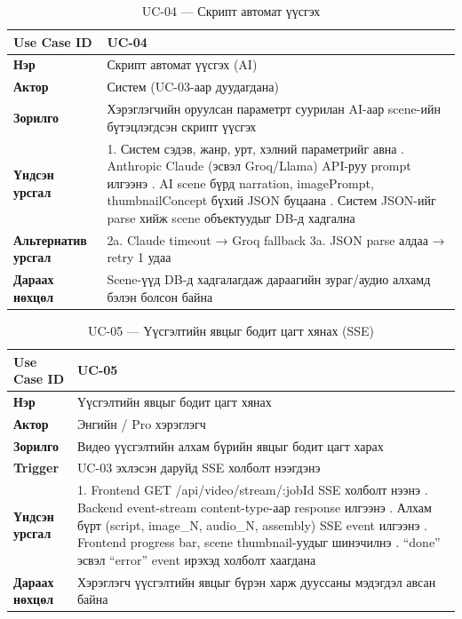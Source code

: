 \begin{table}[H]
\centering
\label{tab:uc04}
\begin{tabular}{|l|p{9.5cm}|}
\hline
\textbf{Use Case ID} & UC-04 \\
\hline
\textbf{Нэр} & Скрипт автомат үүсгэх (AI) \\
\hline
\textbf{Актор} & Систем (UC-03-аар дуудагдана) \\
\hline
\textbf{Зорилго} & Хэрэглэгчийн оруулсан параметрт суурилан AI-аар scene-ийн бүтэцлэгдсэн скрипт үүсгэх \\
\hline
\textbf{Үндсэн урсгал} &
1. Систем сэдэв, жанр, урт, хэлний параметрийг авна \newline
2. Anthropic Claude (эсвэл Groq/Llama) API-руу prompt илгээнэ \newline
3. AI scene бүрд narration, imagePrompt, thumbnailConcept бүхий JSON буцаана \newline
4. Систем JSON-ийг parse хийж scene объектуудыг DB-д хадгална \\
\hline
\textbf{Альтернатив урсгал} & 2a. Claude timeout → Groq fallback \newline 3a. JSON parse алдаа → retry 1 удаа \\
\hline
\textbf{Дараах нөхцөл} & Scene-үүд DB-д хадгалагдаж дараагийн зураг/аудио алхамд бэлэн болсон байна \\
\hline
\end{tabular}
\caption{UC-04 --- Скрипт автомат үүсгэх}
\end{table}

\begin{table}[H]
\centering
\label{tab:uc05}
\begin{tabular}{|l|p{9.5cm}|}
\hline
\textbf{Use Case ID} & UC-05 \\
\hline
\textbf{Нэр} & Үүсгэлтийн явцыг бодит цагт хянах \\
\hline
\textbf{Актор} & Энгийн / Pro хэрэглэгч \\
\hline
\textbf{Зорилго} & Видео үүсгэлтийн алхам бүрийн явцыг бодит цагт харах \\
\hline
\textbf{Trigger} & UC-03 эхлэсэн даруйд SSE холболт нээгдэнэ \\
\hline
\textbf{Үндсэн урсгал} &
1. Frontend GET /api/video/stream/:jobId SSE холболт нээнэ \newline
2. Backend event-stream content-type-аар response илгээнэ \newline
3. Алхам бүрт (script, image\_N, audio\_N, assembly) SSE event илгээнэ \newline
4. Frontend progress bar, scene thumbnail-уудыг шинэчилнэ \newline
5. ``done'' эсвэл ``error'' event ирэхэд холболт хаагдана \\
\hline
\textbf{Дараах нөхцөл} & Хэрэглэгч үүсгэлтийн явцыг бүрэн харж дууссаны мэдэгдэл авсан байна \\
\hline
\end{tabular}
\caption{UC-05 --- Үүсгэлтийн явцыг бодит цагт хянах (SSE)}
\end{table}

